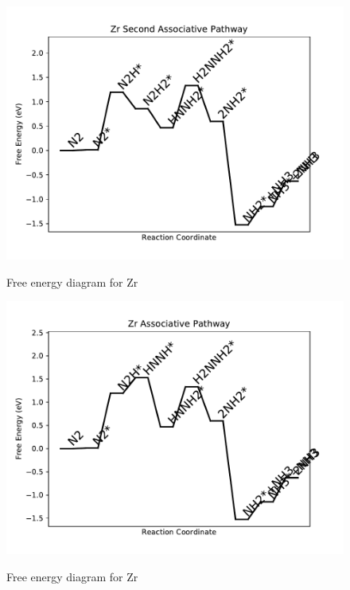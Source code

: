 \documentclass{article}
\begin{document}
\begin{figure}
\includegraphics[width=1\linewidth]{data/plots/Zr_associative_2.pdf}
\label{fig:Zr_associative_2}
\caption{Free energy diagram for Zr}
\end{figure}

\begin{figure}
\includegraphics[width=1\linewidth]{data/plots/Zr_associative.pdf}
\label{fig:Zr_associative}
\caption{Free energy diagram for Zr}
\end{figure}
\end{document}
